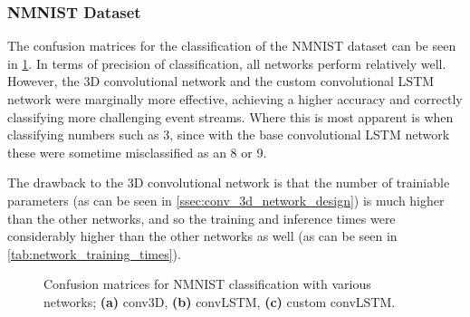 \subsubsection{NMNIST Dataset}

The confusion matrices for the classification of the NMNIST dataset can be seen in \cref{fig:nmnist_c_matrices}. In terms of precision of classification, all networks perform relatively well. However, the 3D convolutional network and the custom convolutional LSTM network were marginally more effective, achieving a higher accuracy and correctly classifying more challenging event streams. Where this is most apparent is when classifying numbers such as 3, since with the base convolutional LSTM network these were sometime misclassified as an 8 or 9. 

The drawback to the 3D convolutional network is that the number of trainiable parameters (as can be seen in \cref{ssec:conv_3d_network_design}) is much higher than the other networks, and so the training and inference times were considerably higher than the other networks as well (as can be seen in \cref{tab:network_training_times}).

\begin{figure}[htb]%
    \centering
    \qquad
    \qquad
    \caption{Confusion matrices for NMNIST classification with various networks; \textbf{(a)} conv3D, \textbf{(b)} convLSTM, \textbf{(c)} custom convLSTM.}%
    \label{fig:nmnist_c_matrices}%
\end{figure}

